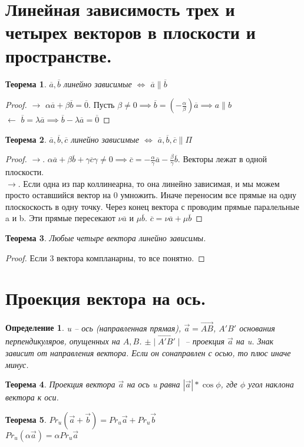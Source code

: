 \documentclass{scrartcl}
\newtheorem{theorem}{Теорема}
\newtheorem{definition}{Определение}
\begin{document}
    \section{Линейная зависимость трех и четырех векторов в плоскости и пространстве.}
    \begin{theorem}
        $\overline{a}, \overline{b}$ линейно зависимые $\iff$  $\overline{a} \parallel \overline{b}$
    \end{theorem}
    \begin{proof}
        $\rightarrow$  $\alpha \overline{a} + \beta \overline{b} = \overline{0}$.
        Пусть $\beta \neq 0 \implies \overline{b} = (-\frac{\alpha}{\beta}) \overline{a} \implies a \parallel b$ \\
        $\leftarrow$  $\overline{b} = \lambda \overline{a} \implies \overline{b} - \lambda \overline{a} = \overline{0}$
    \end{proof}
    \begin{theorem}
        $\overline{a},\overline{b},\overline{c}$ линейно зависимые $\iff$  $\overline{a}, \overline{b},\overline{c} \parallel \Pi$
    \end{theorem}
    \begin{proof}
        $\rightarrow$.  $\alpha \overline{a} + \beta \overline{b} + \gamma \overline{c} \gamma \neq 0 \implies \overline{c} = -\frac{\alpha}{\gamma}\overline{a} - \frac{\beta}{\gamma} \overline{b}$. Векторы лежат в одной плоскости.\\
        $\rightarrow$. Если одна из пар коллинеарна, то она линейно зависимая, и мы можем просто оставшийся вектор на 0 умножить. Иначе переносим все прямые на одну плоскоскость в одну точку. Через конец вектора с проводим прямые паралельные  a и b.
        Эти прямые пересекают  $\nu \overline{a}$ и $\mu \overline{b}$. $\overline{ c} = \nu \overline{a} + \mu \overline{b}$
    \end{proof}
    \begin{theorem}
        Любые четыре вектора линейно зависимы.
    \end{theorem}
    \begin{proof}
        Если 3 вектора компланарны, то все понятно.
    \end{proof}
    \section{Проекция вектора на ось.}
    \begin{definition}
        u -- ось (направленная прямая), $\vec{a} = \vec{AB}$, $A' B'$ основания перпендикуляров, опущенных на  $A, B$.  $\pm \mid \vec{A'B'} \mid$ -- проекция $\vec{a}$ на u.
        Знак зависит от направления вектора. Если он сонаправлен с осью, то плюс иначе минус.
    \end{definition}
    \begin{theorem}
        Проекция вектора $\vec{a}$ на ось u равна $|\vec{a}| * \cos{\phi}$, где $\phi$  угол наклона вектора к оси.
    \end{theorem}
    \begin{theorem}
        $Pr_u( \vec{a} + \vec{b} ) = Pr_{u}\vec{a} + Pr_{u}\vec{b}$\\
        $Pr_{u}(\alpha \vec{a}) = \alpha Pr_{u} \vec{a}$
    \end{theorem}
\end{document}

